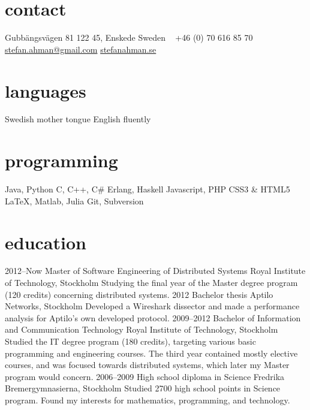 \documentclass[]{friggeri-cv} %
\begin{document}


\begin{aside} %
\section{contact}
Gubbängsvägen 81
122 45, Enskede
Sweden
~
+46 (0) 70 616 85 70
~
\href{mailto:stefan.ahman@gmail.com}{stefan.ahman@gmail.com}
\href{http://www.stefanahman.se}{stefanahman.se}
\section{languages}
Swedish mother tongue
English fluently
\section{programming}
Java, Python
C, C++, C\#
Erlang, Haskell
Javascript, PHP
CSS3 \& HTML5
LaTeX, Matlab, Julia
Git, Subversion
\end{aside}


\section{education}

\begin{entrylist}
\entry
{2012--Now}
{Master {\normalfont of Software Engineering of Distributed Systems}}
{Royal Institute of Technology, Stockholm}
{Studying the final year of the Master degree program (120 credits) concerning distributed systems.}
\entry
{2012}
{Bachelor {\normalfont thesis}}
{Aptilo Networks, Stockholm}
{Developed a Wireshark dissector and made a performance analysis for Aptilo's own developed protocol.}
\entry
{2009--2012}
{Bachelor {\normalfont of Information and Communication Technology}}
{Royal Institute of Technology, Stockholm}
{Studied the IT degree program (180 credits), targeting various basic programming and engineering courses. The third year contained mostly elective courses, and was focused towards distributed systems, which later my Master program would concern.}
\entry
{2006--2009}
{High school diploma {\normalfont in Science}}
{Fredrika Bremergymnasierna, Stockholm}
{Studied 2700 high school points in Science program. Found my interests for mathematics, programming, and technology.}
\end{entrylist}
\end{document}
